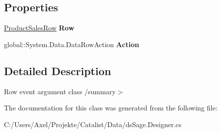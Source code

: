 \subsection*{Properties}
\begin{DoxyCompactItemize}
\item 
\hyperlink{class_products_1_1_data_1_1ds_sage_1_1_product_sales_row}{Product\+Sales\+Row} {\bfseries Row}\hypertarget{class_products_1_1_data_1_1ds_sage_1_1_product_sales_row_change_event_a658e2634e8f98659641e346b936f631c}{}\label{class_products_1_1_data_1_1ds_sage_1_1_product_sales_row_change_event_a658e2634e8f98659641e346b936f631c}

\item 
global\+::\+System.\+Data.\+Data\+Row\+Action {\bfseries Action}\hypertarget{class_products_1_1_data_1_1ds_sage_1_1_product_sales_row_change_event_ac26f69d215c4787af1beed6ededd737c}{}\label{class_products_1_1_data_1_1ds_sage_1_1_product_sales_row_change_event_ac26f69d215c4787af1beed6ededd737c}

\end{DoxyCompactItemize}


\subsection{Detailed Description}
Row event argument class /summary$>$ 

The documentation for this class was generated from the following file\+:\begin{DoxyCompactItemize}
\item 
C\+:/\+Users/\+Axel/\+Projekte/\+Catalist/\+Data/ds\+Sage.\+Designer.\+cs\end{DoxyCompactItemize}
